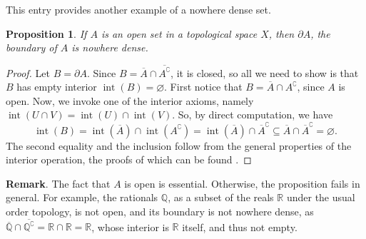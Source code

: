 \documentclass[12pt]{article}
\newtheorem{prop}{Proposition}
\def\int{\operatorname{int}}
\begin{document}
This entry provides another example of a nowhere dense set.

\begin{prop}  If $A$ is an open set in a topological space $X$, then $\partial A$, the boundary of $A$ is nowhere dense.
\end{prop}

\begin{proof}  Let $B=\partial A$.  Since $B = \overline{A}\cap \overline{A^\complement}$, it is closed, so all we need to show is that $B$ has empty interior $\int(B)=\varnothing$.  First notice that $B= \overline{A}\cap A^\complement$, since $A$ is open.  Now, we invoke one of the interior axioms, namely $\int(U\cap V)=\int(U)\cap \int(V)$.  So, by direct computation, we have 
$$\int(B)=\int(\overline{A})\cap \int(A^\complement) = \int(\overline{A})\cap \overline{A}^\complement \subseteq \overline{A}\cap \overline{A}^\complement =\varnothing.$$
The second equality and the inclusion follow from the general properties of the interior operation, the proofs of which can be found .
\end{proof}

\textbf{Remark}.  The fact that $A$ is open is essential.  Otherwise, the proposition fails in general.  For example, the rationals $\mathbb{Q}$, as a subset of the reals $\mathbb{R}$ under the usual order topology, is not open, and its boundary is not nowhere dense, as $\overline{\mathbb{Q}}\cap \overline{\mathbb{Q}^\complement} = \mathbb{R}\cap \mathbb{R}=\mathbb{R}$, whose interior is $\mathbb{R}$ itself, and thus not empty.
\end{document}
